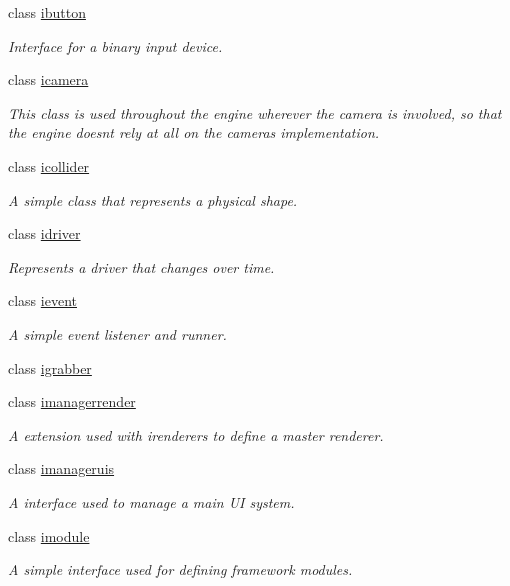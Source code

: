 \begin{DoxyCompactItemize}
class \hyperlink{classflounder_1_1ibutton}{ibutton}
\begin{DoxyCompactList}\small\item\em Interface for a binary input device. \end{DoxyCompactList}\item 
class \hyperlink{classflounder_1_1icamera}{icamera}
\begin{DoxyCompactList}\small\item\em This class is used throughout the engine wherever the camera is involved, so that the engine doesn\textquotesingle{}t rely at all on the camera\textquotesingle{}s implementation. \end{DoxyCompactList}\item 
class \hyperlink{classflounder_1_1icollider}{icollider}
\begin{DoxyCompactList}\small\item\em A simple class that represents a physical shape. \end{DoxyCompactList}\item 
class \hyperlink{classflounder_1_1idriver}{idriver}
\begin{DoxyCompactList}\small\item\em Represents a driver that changes over time. \end{DoxyCompactList}\item 
class \hyperlink{classflounder_1_1ievent}{ievent}
\begin{DoxyCompactList}\small\item\em A simple event listener and runner. \end{DoxyCompactList}\item 
class \hyperlink{classflounder_1_1igrabber}{igrabber}
\item 
class \hyperlink{classflounder_1_1imanagerrender}{imanagerrender}
\begin{DoxyCompactList}\small\item\em A extension used with irenderers to define a master renderer. \end{DoxyCompactList}\item 
class \hyperlink{classflounder_1_1imanageruis}{imanageruis}
\begin{DoxyCompactList}\small\item\em A interface used to manage a main UI system. \end{DoxyCompactList}\item 
class \hyperlink{classflounder_1_1imodule}{imodule}
\begin{DoxyCompactList}\small\item\em A simple interface used for defining framework modules. \end{DoxyCompactList}\item 

\end{DoxyCompactItemize}
